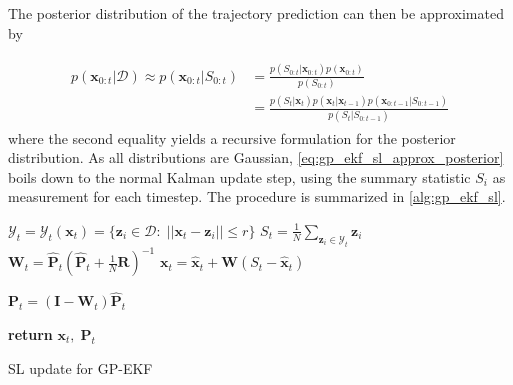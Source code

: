 The posterior distribution of the trajectory prediction can then be approximated by

\begin{align}\label{eq:gp_ekf_sl_approx_posterior}
    \begin{split}
        p(\boldsymbol{x}_{0:t} | \mathcal{D}) \approx p(\boldsymbol{x}_{0:t} | S_{0:t}) &= \frac{p(S_{0:t} | \boldsymbol{x}_{0:t}) p(\boldsymbol{x}_{0:t})}{p(S_{0:t})}\\
        &= \frac{p(S_t | \boldsymbol{x}_t)p(\boldsymbol{x}_t | \boldsymbol{x}_{t-1}) p(\boldsymbol{x}_{0:t-1} | S_{0:t-1})}{p(S_t | S_{0:t-1})}
    \end{split}
\end{align}
where the second equality yields a recursive formulation for the posterior distribution. As all distributions are Gaussian, \cref{eq:gp_ekf_sl_approx_posterior} boils down to the normal Kalman update step, using the summary statistic $S_i$ as measurement for each timestep. The procedure is summarized in \cref{alg:gp_ekf_sl}.


\begin{algorithm}[h]
    \begin{algorithmic}[1]
        \State $\mathcal{Y}_t = \mathcal{Y}_t(\boldsymbol{x}_t) = \{\boldsymbol{z}_i \in \mathcal{D} : \; ||\boldsymbol{x}_t - \boldsymbol{z}_i|| \leq r\}$
        \State $S_t = \frac{1}{N} \sum_{\boldsymbol{z}_i \in \mathcal{Y}_t} \boldsymbol{z}_i$
            \State $\boldsymbol{W}_t = \hat{\boldsymbol{P}}_t (\hat{\boldsymbol{P}}_t + \frac{1}{N} \boldsymbol{R})^{-1}$ 
            \State $\boldsymbol{x}_t = \hat{\boldsymbol{x}}_t + \boldsymbol{W}(S_t - \hat{\boldsymbol{x}}_t)$

            \State $\boldsymbol{P}_t = (\boldsymbol{I} - \boldsymbol{W}_t) \hat{\boldsymbol{P}}_t$

            \State \textbf{return} $\boldsymbol{x}_t, \; \boldsymbol{P}_t$
        \EndProcedure
    \end{algorithmic}
    \caption{SL update for GP-EKF}
    \label{alg:gp_ekf_sl}
\end{algorithm}

